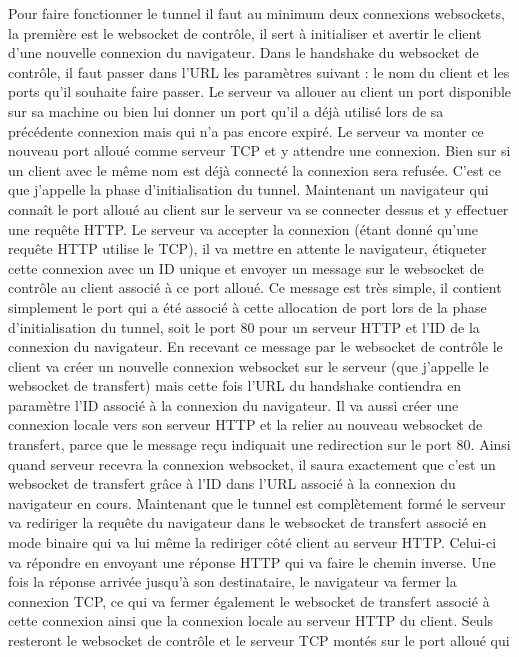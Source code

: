 Pour faire fonctionner le tunnel il faut au minimum deux connexions
websockets, la première est le websocket de contrôle, il sert à
initialiser et avertir le client d'une nouvelle connexion du
navigateur. Dans le handshake du websocket de contrôle, il faut passer
dans l'URL les paramètres suivant : le nom du client et les ports
qu'il souhaite faire passer. Le serveur va allouer au client un port
disponible sur sa machine ou bien lui donner un port qu'il a déjà
utilisé lors de sa précédente connexion mais qui n'a pas encore
expiré. Le serveur va monter ce nouveau port alloué comme serveur TCP
et y attendre une connexion. Bien sur si un client avec le même nom
est déjà connecté la connexion sera refusée. C'est ce que j'appelle la
phase d'initialisation du tunnel. Maintenant un navigateur qui connaît
le port alloué au client sur le serveur va se connecter dessus et y
effectuer une requête HTTP. Le serveur va accepter la connexion (étant
donné qu'une requête HTTP utilise le TCP), il va mettre en attente le
navigateur, étiqueter cette connexion avec un ID unique et envoyer un
message sur le websocket de contrôle au client associé à ce port
alloué. Ce message est très simple, il contient simplement le port qui
a été associé à cette allocation de port lors de la phase
d'initialisation du tunnel, soit le port 80 pour un serveur HTTP et
l'ID de la connexion du navigateur. En recevant ce message par le
websocket de contrôle le client va créer un nouvelle connexion
websocket sur le serveur (que j'appelle le websocket de transfert)
mais cette fois l'URL du handshake contiendra en paramètre l'ID
associé à la connexion du navigateur. Il va aussi créer une connexion
locale vers son serveur HTTP et la relier au nouveau websocket de
transfert, parce que le message reçu indiquait une redirection sur le
port 80. Ainsi quand serveur recevra la connexion websocket, il saura
exactement que c'est un websocket de transfert grâce à l'ID dans l'URL
associé à la connexion du navigateur en cours. Maintenant que le
tunnel est complètement formé le serveur va rediriger la requête du
navigateur dans le websocket de transfert associé en mode binaire qui
va lui même la rediriger côté client au serveur HTTP. Celui-ci va
répondre en envoyant une réponse HTTP qui va faire le chemin
inverse. Une fois la réponse arrivée jusqu'à son destinataire, le
navigateur va fermer la connexion TCP, ce qui va fermer également le
websocket de transfert associé à cette connexion ainsi que la
connexion locale au serveur HTTP du client. Seuls resteront le
websocket de contrôle et le serveur TCP montés sur le port alloué qui
